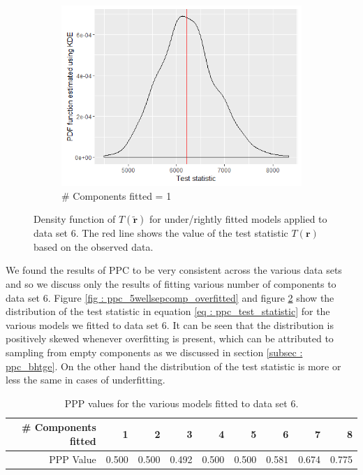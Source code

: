 \begin{figure}[!htb]
\begin{subfigure}[b]{0.4\textwidth}
		\includegraphics[width=\textwidth]{mainmatter/chapter_5_simulation_study/ppc_5wellsep1comp.png}
          \caption{\label{fig : ppc_5wellsep1comp}\# Components fitted = 1}
	\end{subfigure}
	\caption{Density function of $T(\boldsymbol{\tilde{r}})$ for under/rightly fitted models applied to data set 6. The red line shows the value of the test statistic $T(\boldsymbol{r})$ based on the observed data.}
	\label{fig : ppc_5wellsepcomp_underfitted}    
\end{figure}

We found the results of PPC to be very consistent across the various data sets and so we discuss only the results of fitting various number of components to data set 6. Figure \ref{fig : ppc_5wellsepcomp_overfitted} and figure \ref{fig : ppc_5wellsepcomp_underfitted} show the distribution of the test statistic in equation \ref{eq : ppc_test_statistic} for the various models we fitted to data set 6. It can be seen that the distribution is positively skewed whenever overfitting is present, which can be attributed to sampling from empty components as we discussed in section \ref{subsec : ppc_bhtge}. On the other hand the distribution of the test statistic is more or less the same in cases of underfitting.\\

\begin{table}[!htb]
\centering
\captionsetup{justification=centering}
\caption{PPP values for the various models fitted to data set 6.}
\label{table : ppp_value_5welsepcomp}
\begin{tabular}{@{}rrrrrrrrr@{}}
\toprule
\# Components fitted & 1 & 2 & 3 & 4 & 5 & 6 & 7 & 8 \\ \midrule
PPP Value & 0.500 & 0.500 & 0.492 & 0.500 & 0.500 & 0.581 & 0.674 & 0.775 \\ \bottomrule
\end{tabular}
\end{table}

